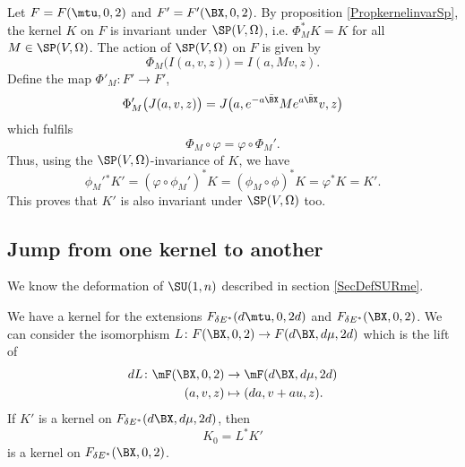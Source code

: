 Let $F=F(\mtu,0,2)$ and $F'=F'(\BX,0,2)$. By proposition \ref{PropkernelinvarSp},  the kernel $K$ on $F$ is invariant under $\SP(V,\Omega)$, i.e. $\Phi^*_{M}K=K$ for all $M\in\SP(V,\Omega)$. The action of $\SP(V,\Omega)$ on $F$ is given by
\[ 
  \Phi_{M}\big( I(a,v,z) \big)=I(a,Mv,z).
\]
Define the map $\Phi'_M\colon F'\to F'$,
\begin{equation}   \label{EqDefPhiprimeM}
\Phi_{M}'\big( J(a,v,z) \big)=J\big( a, e^{-a\bar{\BX }}M e^{a\bar{\BX }}v,z \big)
\end{equation}
which fulfils 
\[ 
  \Phi_{M}\circ\varphi=\varphi\circ\Phi_{M}'.
\]
Thus, using the $\SP(V,\Omega)$-invariance of $K$, we have
\[ 
\phi_{M}'{}^*K'=(\varphi\circ\phi_{M}')^*K=(\phi_{M}\circ\phi)^*K=\varphi^*K=K'.
\]
This proves that $K'$ is also invariant under $\SP(V,\Omega)$ too.

\subsection{Jump from one kernel to another}

We know the deformation of $\SU(1,n)$ described in section \ref{SecDefSURme}.

We have a kernel for the extensions $F_{\delta E^*}(d\mtu,0,2d)$ and $F_{\delta E^*}(\BX ,0,2)$. We can consider the isomorphism $L\colon F(\BX ,0,2)\to F(d\BX ,d\mu,2d)$ which is the lift of
\begin{equation}
\begin{aligned}
 dL\colon \mF(\BX ,0,2)&\to \mF(d\BX ,d\mu,2d) \\ 
  (a,v,z)&\mapsto (da,v+au,z).
\end{aligned}
\end{equation}
If $K'$ is a kernel on $F_{\delta E^*}(d\BX ,d\mu,2d)$, then
\[ 
  K_{0}=L^*K'
\]
is a kernel on $F_{\delta E^*}(\BX ,0,2)$.

